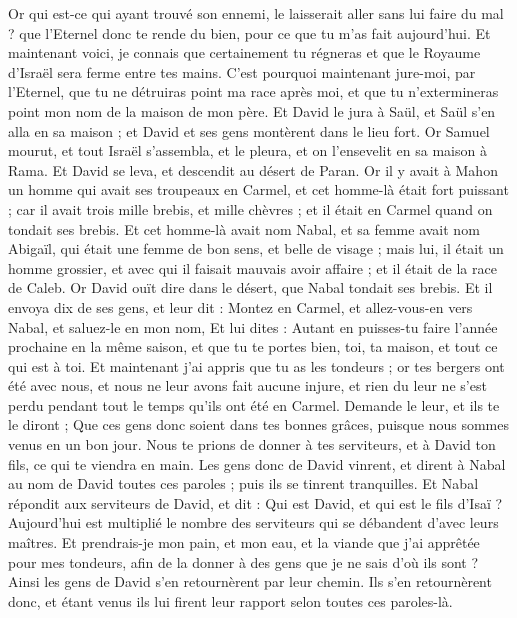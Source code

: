 \begin{multicols}{2}
Or qui est-ce qui ayant trouvé son ennemi, le laisserait aller sans lui faire du mal ? que l'Eternel donc te rende du bien, pour ce que tu m'as fait aujourd'hui.
Et maintenant voici, je connais que certainement tu régneras et que le Royaume d'Israël sera ferme entre tes mains.
C'est pourquoi maintenant jure-moi, par l'Eternel, que tu ne détruiras point ma race après moi, et que tu n'extermineras point mon nom de la maison de mon père.
Et David le jura à Saül, et Saül s'en alla en sa maison ; et David et ses gens montèrent dans le lieu fort.
\VerseOne{}Or Samuel mourut, et tout Israël s'assembla, et le pleura, et on l'ensevelit en sa maison à Rama. Et David se leva, et descendit au désert de Paran.
Or il y avait à Mahon un homme qui avait ses troupeaux en Carmel, et cet homme-là était fort puissant ; car il avait trois mille brebis, et mille chèvres ; et il était en Carmel quand on tondait ses brebis.
Et cet homme-là avait nom Nabal, et sa femme avait nom Abigaïl, qui était une femme de bon sens, et belle de visage ; mais lui, il était un homme grossier, et avec qui il faisait mauvais avoir affaire ; et il était de la race de Caleb.
Or David ouït dire dans le désert, que Nabal tondait ses brebis.
Et il envoya dix de ses gens, et leur dit : Montez en Carmel, et allez-vous-en vers Nabal, et saluez-le en mon nom,
Et lui dites : Autant en puisses-tu faire l'année prochaine en la même saison, et que tu te portes bien, toi, ta maison, et tout ce qui est à toi.
Et maintenant j'ai appris que tu as les tondeurs ; or tes bergers ont été avec nous, et nous ne leur avons fait aucune injure, et rien du leur ne s'est perdu pendant tout le temps qu'ils ont été en Carmel.
Demande le leur, et ils te le diront ; Que ces gens donc soient dans tes bonnes grâces, puisque nous sommes venus en un bon jour. Nous te prions de donner à tes serviteurs, et à David ton fils, ce qui te viendra en main.
Les gens donc de David vinrent, et dirent à Nabal au nom de David toutes ces paroles ; puis ils se tinrent tranquilles.
Et Nabal répondit aux serviteurs de David, et dit : Qui est David, et qui est le fils d'Isaï ? Aujourd'hui est multiplié le nombre des serviteurs qui se débandent d'avec leurs maîtres.
Et prendrais-je mon pain, et mon eau, et la viande que j'ai apprêtée pour mes tondeurs, afin de la donner à des gens que je ne sais d'où ils sont ?
Ainsi les gens de David s'en retournèrent par leur chemin. Ils s'en retournèrent donc, et étant venus ils lui firent leur rapport selon toutes ces paroles-là.

\end{multicols}

